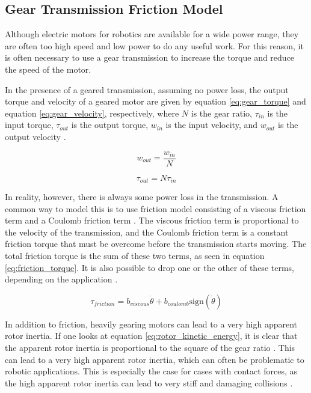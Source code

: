 \subsection{Gear Transmission Friction Model}

    Although electric motors for robotics are available for a wide power range, they are often too high speed and low power to do any useful work. For this reason, it is often necessary to use a gear transmission to increase the torque and reduce the speed of the motor. 

    In the presence of a geared transmission, assuming no power loss, the output torque and velocity of a geared motor are given by equation \ref{eq:gear_torque} and equation \ref{eq:gear_velocity}, respectively, where $N$ is the gear ratio, $\tau_{in}$ is the input torque, $\tau_{out}$ is the output torque, $w_{in}$ is the input velocity, and $w_{out}$ is the output velocity \cite{modern_robotics_book}.

    \begin{equation}
        \label{eq:gear_torque}
        w_ {out} = \frac{w_{in}}{N}
    \end{equation}

    \begin{equation}
        \label{eq:gear_velocity}
        \tau_{out} = N\tau_{in}
    \end{equation}

    In reality, however, there is always some power loss in the transmission. A common way to model this is to use friction model consisting of a viscous friction term and a Coulomb friction term \cite{modern_robotics_book}. The viscous friction term is proportional to the velocity of the transmission, and the Coulomb friction term is a constant friction torque that must be overcome before the transmission starts moving. The total friction torque is the sum of these two terms, as seen in equation \ref{eq:friction_torque}. It is also possible to drop one or the other of these terms, depending on the application \cite{modern_robotics_book}.

    \begin{equation}
        \label{eq:friction_torque}
        \tau_{friction} = b_{viscous}\dot{\theta} + b_{coulomb}\text{sign}(\dot{\theta})  
    \end{equation}

    In addition to friction, heavily gearing motors can lead to a very high apparent rotor inertia. If one looks at equation \ref{eq:rotor_kinetic_energy}, it is clear that the apparent rotor inertia is proportional to the square of the gear ratio \cite{modern_robotics_book}. This can lead to a very high apparent rotor inertia, which can often be problematic to robotic applications. This is especially the case for cases with contact forces, as the high apparent rotor inertia can lead to very stiff and damaging collisions \cite{proprioceptive}.


